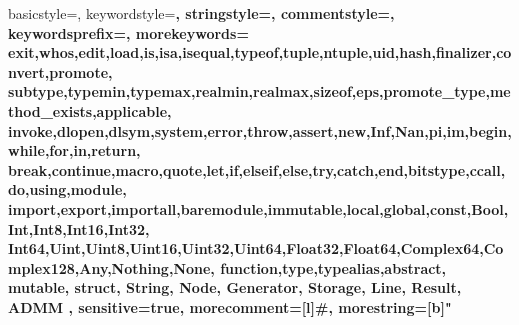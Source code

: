 


\usepackage{listings}
\renewcommand{\lstlistlistingname}{List of \lstlistingname s}
\usepackage{inconsolata} %
\usepackage[usenames,dvipsnames]{color} %


{
  basicstyle=\small\ttfamily,
  keywordstyle=\color{Blue}\bfseries,
  stringstyle=\color{Maroon},
  commentstyle=\sffamily\color{OliveGreen},
  keywordsprefix=\@,
  morekeywords={
    exit,whos,edit,load,is,isa,isequal,typeof,tuple,ntuple,uid,hash,finalizer,convert,promote,
    subtype,typemin,typemax,realmin,realmax,sizeof,eps,promote_type,method_exists,applicable,
    invoke,dlopen,dlsym,system,error,throw,assert,new,Inf,Nan,pi,im,begin,while,for,in,return,
    break,continue,macro,quote,let,if,elseif,else,try,catch,end,bitstype,ccall,do,using,module,
    import,export,importall,baremodule,immutable,local,global,const,Bool,Int,Int8,Int16,Int32,
    Int64,Uint,Uint8,Uint16,Uint32,Uint64,Float32,Float64,Complex64,Complex128,Any,Nothing,None,
    function,type,typealias,abstract, mutable, struct, String, Node, Generator, Storage, Line, Result, ADMM
  },
  sensitive=true,
  morecomment=[l]{\#},
  morestring=[b]" 
}

\usepackage{graphicx}
\graphicspath{ {./images/} }

\usepackage{url}

